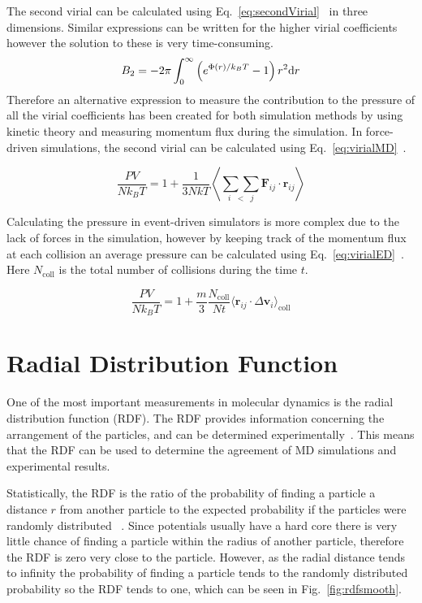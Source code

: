 \documentclass[12pt]{UoAthesis} \usepackage{booktabs}
\begin{document}
The second virial can be calculated using
Eq.~\eqref{eq:secondVirial}~\cite{Smith2005} in three
dimensions. Similar expressions can be written for the higher virial
coefficients however the solution to these is very time-consuming.
\begin{equation}
  \label{eq:secondVirial}
  B_2 = -2\pi \int^\infty_0 \left(e^{\Phi(r)/k_BT}-1\right)r^2{\rm d}r
\end{equation}
Therefore an alternative expression to measure the contribution to the
pressure of all the virial coefficients has been created for both
simulation methods by using kinetic theory and measuring momentum flux
during the simulation.  In force-driven simulations, the second virial
can be calculated using Eq.~\eqref{eq:virialMD}~\cite{Haile1997}.

\begin{equation}
  \label{eq:virialMD}
  \frac{PV}{Nk_BT} = 1 +
  \frac{1}{3NkT}\left \langle\underset{i\;\;<\;\;j}{\sum\sum}\mathbf{F}_{ij}\cdot\mathbf{r}_{ij} \right\rangle
\end{equation}

Calculating the pressure in event-driven simulators is more complex
due to the lack of forces in the simulation, however by keeping track
of the momentum flux at each collision an average pressure can be
calculated using Eq.~\eqref{eq:virialED}~\cite{Lue2005}.  Here
$N_{\text{coll}}$ is the total number of collisions during the time
$t$.

\begin{equation}
  \label{eq:virialED}
  \frac{PV}{Nk_BT} = 1 +
  \frac{m}{3}\frac{N_{\text{coll}}}{Nt}\langle\mathbf{r}_{ij}\cdot\Delta \mathbf{v}_i\rangle_{\text{coll}}
\end{equation}
\section{Radial Distribution Function}
\label{sec:RDF}
One of the most important measurements in molecular dynamics is the
radial distribution function (RDF).  The RDF provides information concerning the
arrangement of the particles, and can be determined
experimentally~\cite{Yarnell1973}.  This means that the RDF can be
used to determine the agreement of MD simulations and experimental
results.

Statistically, the RDF is the ratio of the probability of finding a
particle a distance $r$ from another particle to the expected
probability if the particles were randomly distributed
~\cite{Allen1987}. Since potentials usually have a hard core there is
very little chance of finding a particle within the radius of another
particle, therefore the RDF is zero very close to the particle.
However, as the radial distance tends to infinity the probability of
finding a particle tends to the randomly distributed probability so
the RDF tends to one, which can be seen in Fig.~\ref{fig:rdfsmooth}.
\end{document}
